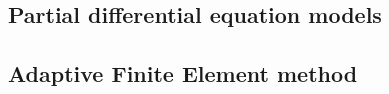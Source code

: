 \subsection{Partial differential equation models} \label{sec:PDE}

\subsection{Adaptive Finite Element method} \label{sec:AdaFE}